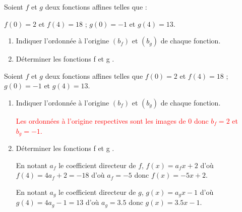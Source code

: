 \begin{exercice*}
    Soient $f$ et $g$ deux fonctions affines telles que : 
    
    $f(0)=2$ et $f(4)=18$ ; $g(0)=-1$ et $g(4)=13$.
    \begin{enumerate}
        \item Indiquer l'ordonnée à l'origine $(b_f)$ et $(b_g)$ de chaque fonction.
        \item Déterminer les fonctions f et g .
    \end{enumerate}    
\end{exercice*}
\begin{corrige}
    Soient $f$ et $g$ deux fonctions affines telles que $f(0)=2$ et $f(4)=18$ ; $g(0)=-1$ et $g(4)=13$.

    \begin{enumerate}
        \item Indiquer l'ordonnée à l'origine $(b_f)$ et $(b_g)$ de chaque fonction.
        
        \textcolor{red}{Les ordonnées à l'origine respectives sont les images de 0 donc $b_f=2$ et $b_g=-1$.}
        \item Déterminer les fonctions f et g .
        
        {\color{red}%
        En notant $a_f$ le coefficient directeur de $f$, $f(x)=a_f x+2$ d'où $f(4)=4a_f +2=-18$ d'où $a_f=-5$ donc $f(x)=-5x+2$.

        En notant $a_g$ le coefficient directeur de $g$, $g(x)=a_g x-1$ d'où $g(4)=4a_g -1=13$ d'où $a_g=\num{3.5}$ donc $g(x)=\num{3.5}x-1$.
        }
    \end{enumerate}
\end{corrige}
